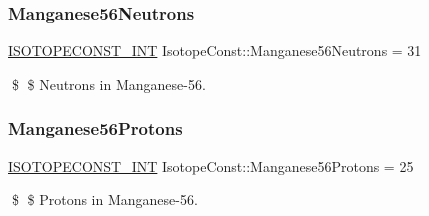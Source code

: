 \subsubsection{\texorpdfstring{Manganese56\+Neutrons}{Manganese56Neutrons}}
{\footnotesize\ttfamily \mbox{\hyperlink{group___isotope_const-_macros_ga5f18360b3e99483a35c32d789e62621c}{I\+S\+O\+T\+O\+P\+E\+C\+O\+N\+S\+T\+\_\+\+I\+NT}} Isotope\+Const\+::\+Manganese56\+Neutrons = 31}

\$ \$ Neutrons in Manganese-\/56. \mbox{\label{group___isotope_const-_manganese-_mn56_ga178fe1c9da412ffa65a692a3d71e90eb}} 
\subsubsection{\texorpdfstring{Manganese56\+Protons}{Manganese56Protons}}
{\footnotesize\ttfamily \mbox{\hyperlink{group___isotope_const-_macros_ga5f18360b3e99483a35c32d789e62621c}{I\+S\+O\+T\+O\+P\+E\+C\+O\+N\+S\+T\+\_\+\+I\+NT}} Isotope\+Const\+::\+Manganese56\+Protons = 25}

\$ \$ Protons in Manganese-\/56. 